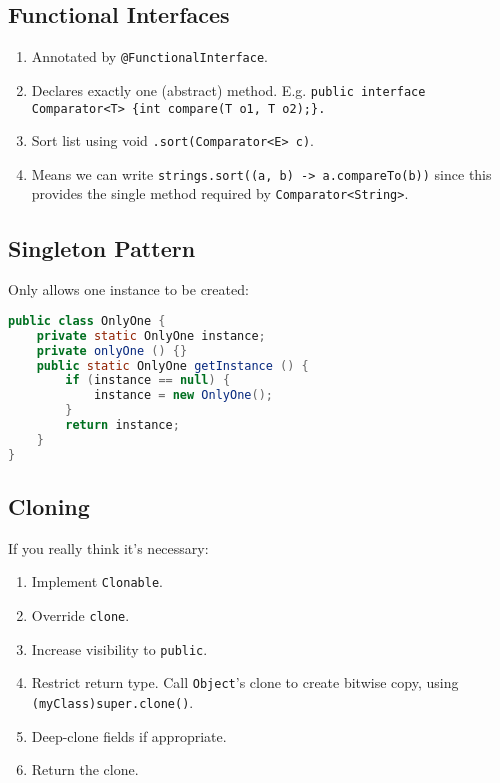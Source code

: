 \documentclass[twocolumn,english]{article}
\begin{document}
\subsection{Functional Interfaces}
\begin{enumerate}
\item Annotated by \texttt{@FunctionalInterface}.
\item Declares exactly one (abstract) method. E.g. \texttt{public interface
Comparator\textless{}T\textgreater{} \{int compare(T o1, T o2);\}.}
\item Sort list using void \texttt{.sort(Comparator\textless{}E\textgreater{}
c)}.
\item Means we can write \texttt{strings.sort((a, b) -\textgreater{} a.compareTo(b))}
since this provides the single method required by \texttt{Comparator\textless{}String\textgreater{}}.
\end{enumerate}

\subsection{Singleton Pattern}

Only allows one instance to be created:

\begin{lstlisting}[language=Java,basicstyle={\footnotesize\ttfamily},tabsize=2,frame=single]
public class OnlyOne {
	private static OnlyOne instance;
	private onlyOne () {}
	public static OnlyOne getInstance () {
		if (instance == null) {
			instance = new OnlyOne(); 
		}
		return instance;
	}
}
\end{lstlisting}



\subsection{Cloning}

If you really think it's necessary:
\begin{enumerate}
\item Implement \texttt{Clonable}.
\item Override \texttt{clone}.
\item Increase visibility to \texttt{public}.
\item Restrict return type. Call \texttt{Object}'s clone to create bitwise
copy, using \texttt{(myClass)super.clone()}.
\item Deep-clone fields if appropriate.
\item Return the clone.
\end{enumerate}
\end{document}
